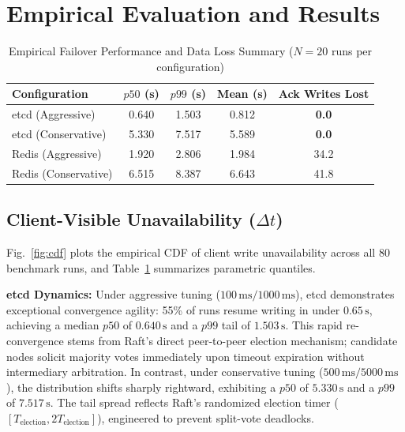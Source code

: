 \documentclass[conference]{IEEEtran}
\begin{document}
\section{Empirical Evaluation and Results}

\begin{table}[t]
\caption{Empirical Failover Performance and Data Loss Summary ($N = 20$ runs per configuration)}
\centering
\begin{tabular}{lcccc}
\toprule
\textbf{Configuration} & \textbf{$p50$ (s)} & \textbf{$p99$ (s)} & \textbf{Mean (s)} & \textbf{Ack Writes Lost} \\
\midrule
etcd (Aggressive)     & 0.640 & 1.503 & 0.812 & \textbf{0.0} \\
etcd (Conservative)   & 5.330 & 7.517 & 5.589 & \textbf{0.0} \\
Redis (Aggressive)    & 1.920 & 2.806 & 1.984 & 34.2 \\
Redis (Conservative)  & 6.515 & 8.387 & 6.643 & 41.8 \\
\bottomrule
\end{tabular}
\label{tab:results}
\end{table}

\subsection{Client-Visible Unavailability ($\Delta t$)}
Fig.~\ref{fig:cdf} plots the empirical CDF of client write unavailability across all 80 benchmark runs, and Table~\ref{tab:results} summarizes parametric quantiles.

\textbf{etcd Dynamics:} Under aggressive tuning ($100\,\text{ms} / 1000\,\text{ms}$), etcd demonstrates exceptional convergence agility: 55\% of runs resume writing in under $0.65\,\text{s}$, achieving a median $p50$ of $0.640\,\text{s}$ and a $p99$ tail of $1.503\,\text{s}$. This rapid re-convergence stems from Raft's direct peer-to-peer election mechanism; candidate nodes solicit majority votes immediately upon timeout expiration without intermediary arbitration. In contrast, under conservative tuning ($500\,\text{ms} / 5000\,\text{ms}$), the distribution shifts sharply rightward, exhibiting a $p50$ of $5.330\,\text{s}$ and a $p99$ of $7.517\,\text{s}$. The tail spread reflects Raft's randomized election timer ($[T_{\text{election}}, 2T_{\text{election}}]$), engineered to prevent split-vote deadlocks.
\end{document}
